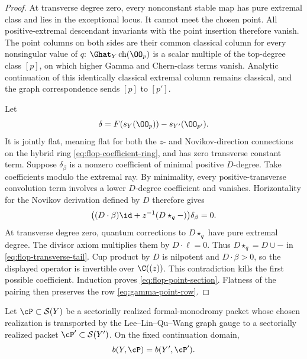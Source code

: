 \begin{proof}
At transverse degree zero, every nonconstant stable map has pure extremal
class and lies in the exceptional locus.  It cannot meet the chosen point.
All positive-extremal descendant invariants with the point insertion
therefore vanish.  The point columns on both sides are their common
classical column for every nonsingular value of \(q\):
\(\Ghat_Y\operatorname{ch}(\OO_p)\) is a scalar multiple of the top-degree
class \([p]\), on which higher Gamma and Chern-class terms vanish.  Analytic
continuation of this identically classical extremal column remains
classical, and the graph correspondence sends \([p]\) to \([p']\).

Let
\[
 \delta=F(s_Y(\OO_p))-s_{Y'}(\OO_{p'}).
\]
It is jointly flat, meaning flat for both the \(z\)- and Novikov-direction
connections on the hybrid ring \eqref{eq:flop-coefficient-ring}, and has zero
transverse constant term.  Suppose
\(\delta_\beta\) is a nonzero coefficient of minimal positive \(D\)-degree.
Take coefficients modulo the extremal ray.  By minimality, every
positive-transverse convolution term involves a lower \(D\)-degree
coefficient and vanishes.  Horizontality for the Novikov derivation defined
by \(D\) therefore gives
\begin{equation}\label{eq:flop-transverse-tail}
 \bigl((D\cdot\beta)\id+z^{-1}(D\star_q-)\bigr)
 \delta_\beta=0.
\end{equation}
At transverse degree zero, quantum corrections to \(D\star_q\) have pure
extremal degree.  The divisor axiom multiplies them by
\(D\cdot\ell=0\).  Thus \(D\star_q=D\cup-\) in
\eqref{eq:flop-transverse-tail}.  Cup product by \(D\)
is nilpotent and \(D\cdot\beta>0\), so the displayed operator is invertible
over \(\C((z))\).  This contradiction kills the first possible coefficient.
Induction proves \eqref{eq:flop-point-section}.  Flatness of the pairing then
preserves the row \eqref{eq:gamma-point-row}.
\end{proof}

\begin{corollary}
\label{cor:ordinary-flop-packet}
Let \(\cP\subset\mathcal S(Y)\) be a sectorially realized formal-monodromy
packet whose chosen realization is transported by the Lee--Lin--Qu--Wang
graph gauge to a sectorially realized packet
\(\cP'\subset\mathcal S(Y')\).  On the fixed continuation domain,
\begin{equation}\label{eq:flop-primary-boolean}
 b(Y,\cP)=b(Y',\cP').
\end{equation}
\end{corollary}

